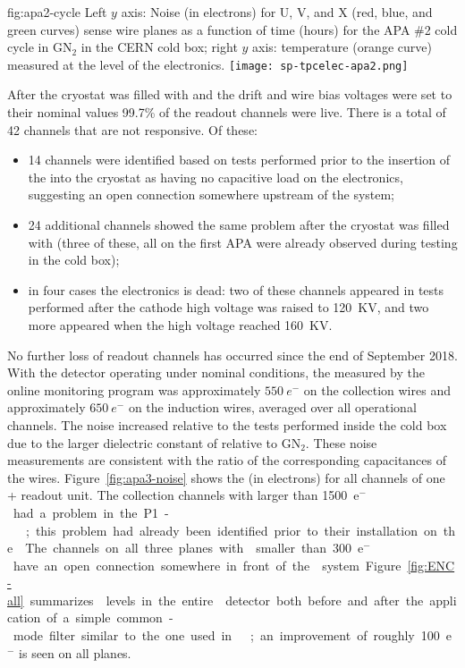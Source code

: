 \begin{dunefigure}
{fig:apa2-cycle}
{Left $y$ axis: Noise (in electrons) for U, V, and X (red, blue, and green 
curves) sense wire planes as a function of time (hours) for the APA \#2 cold 
cycle in GN$_2$ in the CERN cold box; right $y$ axis: temperature 
(orange curve) measured at the level of the  electronics.}
\texttt{[image: sp-tpcelec-apa2.png]}
\end{dunefigure}
After the cryostat was filled with  and the drift and wire 
bias voltages were set to their nominal values
99.7\% of the  readout channels were live.
There is a total of 42 channels that are not responsive. Of these:
\begin{itemize}
\item{14 channels were identified based on tests performed prior
to the insertion of the  into the cryostat as having
no capacitive load on the  electronics, suggesting an open 
connection somewhere upstream  of the  system;}
\item{24 additional channels showed the same problem after the
cryostat was filled with  (three of these, all on the
first APA were already observed during testing in the cold box);}
\item{in four cases the  electronics is dead: two of these
channels appeared in tests performed after the cathode high
voltage was raised to \SI{120}{KV}, and two more
appeared when the high voltage reached \SI{160}{KV}.}
\end{itemize}


No further loss of readout channels has occurred since 
the end of September 2018.
With the detector operating under nominal
conditions, the 
measured by the online monitoring program was approximately $\SI{550}{e^-}$ 
on the collection wires and approximately $\SI{650}{e^-}$ on the induction
wires, averaged over all operational channels. The noise increased
relative to the tests performed inside the cold box due to the 
larger dielectric constant of  relative to GN$_2$. 
These noise measurements 
are consistent with the 
ratio of the corresponding capacitances of the  wires. 
Figure~\ref{fig:apa3-noise} 
shows the  (in electrons) for all channels of one 
+ readout unit. 
The collection channels with  larger than \SI{1500}{e$^-$} had a problem 
in the P1- ; this problem had already been identified 
prior to their
installation on the . The channels on all three planes 
with  smaller than \SI{300}{e$^-$} have an open connection somewhere in 
front of the  system. Figure~\ref{fig:ENC-all} summarizes
 levels in the entire  detector both before and
after the application of a simple common-mode filter similar
to the one used in ~\cite{Acciarri:2017sde};
an improvement of roughly 100~e$^-$ is seen on all planes. 

